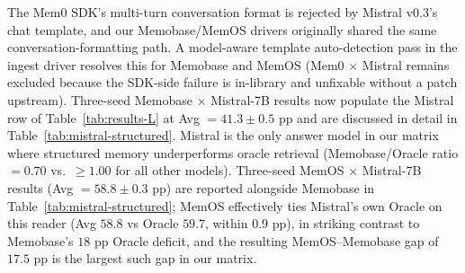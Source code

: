 The Mem0 SDK's multi-turn conversation format is rejected by Mistral v0.3's chat template, and our Memobase/MemOS drivers originally shared the same conversation-formatting path. A model-aware template auto-detection pass in the ingest driver resolves this for Memobase and MemOS (Mem0 $\times$ Mistral remains excluded because the SDK-side failure is in-library and unfixable without a patch upstream). Three-seed Memobase $\times$ Mistral-7B results now populate the Mistral row of Table~\ref{tab:results-L} at Avg $= 41.3 \pm 0.5$ pp and are discussed in detail in Table~\ref{tab:mistral-structured}. Mistral is the only answer model in our matrix where structured memory underperforms oracle retrieval (Memobase/Oracle ratio $= 0.70$ vs.\ $\geq 1.00$ for all other models). Three-seed MemOS $\times$ Mistral-7B results (Avg $= 58.8 \pm 0.3$ pp) are reported alongside Memobase in Table~\ref{tab:mistral-structured}; MemOS effectively ties Mistral's own Oracle on this reader (Avg $58.8$ vs Oracle $59.7$, within $0.9$ pp), in striking contrast to Memobase's $18$ pp Oracle deficit, and the resulting MemOS--Memobase gap of $17.5$ pp is the largest such gap in our matrix.

